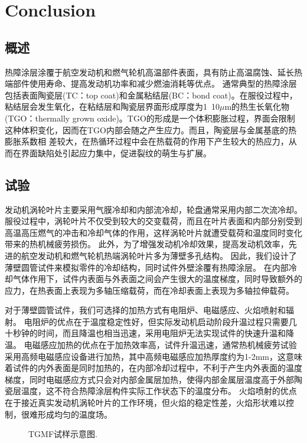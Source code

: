 \chapter{Conclusion}

\section{概述}
热障涂层涂覆于航空发动机和燃气轮机高温部件表面，具有防止高温腐蚀、延长热端部件使用寿命、提高发动机功率和减少燃油消耗等优点。
通常典型的热障涂层包括表面陶瓷层(TC：top coat)和金属粘结层(BC：bond coat)。在服役过程中，粘结层会发生氧化，在粘结层和陶瓷层界面形成厚度为1~10$\mu$m的热生长氧化物(TGO：thermally grown oxide)。TGO的形成是一个体积膨胀过程，界面会限制这种体积变化，因而在TGO内部会随之产生应力。而且，陶瓷层与金属基底的热膨胀系数相
差较大，在热循环过程中会在热载荷的作用下产生较大的热应力，从而在界面缺陷处引起应力集中，促进裂纹的萌生与扩展。
\section{试验}

发动机涡轮叶片主要采用气膜冷却和内部流冷却，轮盘通常采用内部二次流冷却。
服役过程中，涡轮叶片不仅受到较大的交变载荷，而且在叶片表面和内部分别受到高温高压燃气的冲击和冷却气体的作用，这样涡轮叶片就遭受载荷和温度同时变化带来的热机械疲劳损伤。
此外，为了增强发动机冷却效果，提高发动机效率，先进的航空发动机和燃气轮机热端涡轮叶片多为薄壁多孔结构。
因此，我们设计了薄壁圆管试件来模拟零件的冷却结构，同时试件外壁涂覆有热障涂层。
在内部冷却气体作用下，试件内表面与外表面之间会产生很大的温度梯度，同时导致额外的应力，在热表面上表现为多轴压缩载荷，而在冷却表面上表现为多轴拉伸载荷。

对于薄壁圆管试件，我们可选择的加热方式有电阻炉、电磁感应、火焰喷射和辐射。
电阻炉的优点在于温度稳定性好，但实际发动机启动阶段升温过程只需要几十秒钟的时间，而且降温也相当迅速，采用电阻炉无法实现试件的快速升温和降温。
电磁感应加热的优点在于加热效率高，试件升温迅速，通常热机械疲劳试验采用高频电磁感应设备进行加热，其中高频电磁感应加热厚度约为1-2mm，这意味着试件的内外表面是同时加热的，在内部冷却过程中，不利于产生内外表面的温度梯度，同时电磁感应方式只会对内部金属层加热，使得内部金属层温度高于外部陶瓷层温度，这不符合热障涂层构件实际工作状态下的温度分布\cite{BRENDEL2008234}。
火焰喷射的优点在于接近真实发动机涡轮叶片的工作环境，但火焰的稳定性差，火焰形状难以控制，很难形成均匀的温度场\cite{MAUGET2017225}。

\begin{figure}[!htp]
\caption{TGMF试样示意图.}
\label{Fig:Specimen}
\end{figure}

